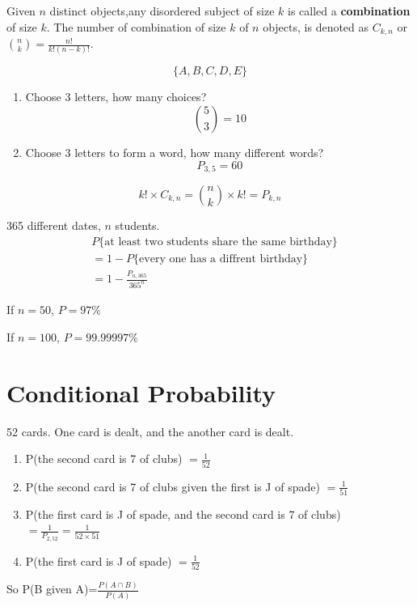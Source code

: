 \begin{defn}
Given $n$ distinct objects,any disordered subject of size $k$ is called a \textbf{combination} of size $k$. The number of combination of size $k$ of $n$ objects, is denoted as $C_{k,n}$ or $\binom nk=\frac{n!}{k!(n-k)!}$.
\end{defn}


\begin{exmp}
\[\{A,B,C,D,E\}\]
\begin{enumerate}
\item  Choose 3 letters, how many choices?
\[\binom 53 =10\]
\item  Choose 3 letters to form a word, how many different words?
\[P_{3,5}=60\]
\end{enumerate}
\end{exmp}

\begin{prop}
\[k!\times C_{k,n}=\binom nk \times k!=P_{k,n}\]
\end{prop}

\begin{exmp} 
365 different dates, $n$ students.
\begin{align*}
&P\{\text{at least two students share the same birthday}\}\\
&=1-P\{\text{every one has a diffrent birthday}\}\\
&=1-\frac{P_{n,365}}{365^n}
\end{align*}

If $n=50$, $P=97\%$

If $n=100$, $P=99.99997\%$
\end{exmp}


\section{Conditional Probability}
\begin{exmp}
52 cards. One card is dealt, and the another card is dealt.
\begin{enumerate}
\item P(the second card is 7 of clubs)
$=\frac{1}{52}$
\item P(the second card is 7 of clubs given the first is J of spade)
$=\frac{1}{51}$
\item P(the first card is J of spade, and the second card is 7 of clubs)
$=\frac{1}{P_{2,52}}=\frac{1}{52\times 51}$
\item P(the first card is J of spade)
$=\frac{1}{52}$
\end{enumerate}

So P(B given A)=$\frac{P(A \cap B)}{P(A)}$
\end{exmp}

